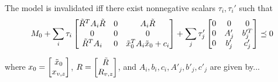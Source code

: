 \documentclass[11pt, onecolumn]{article}
\begin{document}
\begin{corollary}
The model is invalidated iff there exist nonnegative scalars $\tau_i, \tau_i'$ such that
  \begin{align*}
  M_0 + \sum_i \tau_i\begin{bmatrix}\tilde R^T A_i \tilde R &0 & A_i \tilde R\\0 & 0 & 0\\\tilde R^T A_i &0& \tilde x_0^TA_i\tilde x_0 + c_i\end{bmatrix} + \sum_j \tau_j'\begin{bmatrix}0 & 0 & 0 \\ 0 & A_j' & b_j'^T\\0 & b_j' & c_j'\end{bmatrix} \preceq 0
  \end{align*}
\end{corollary}

where $x_0 = \begin{bmatrix}\tilde x_0\\ x_{v,z}\end{bmatrix}$, $R = \begin{bmatrix}\tilde R\\R_{v,z}\end{bmatrix}$, and $A_i,b_i,c_i,A'_j,b'_j,c'_j$ are given by...
\end{document}
